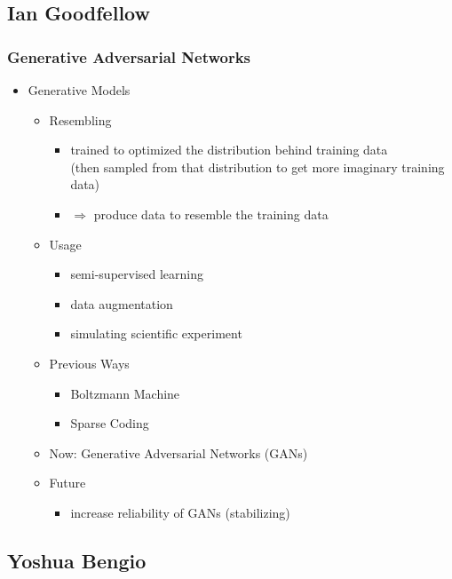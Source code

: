 \subsection{Ian Goodfellow}
\subsubsection{Generative Adversarial Networks}
\begin{itemize}
\item Generative Models
	\begin{itemize}
	\item Resembling
		\begin{itemize}
		\item trained to optimized the distribution behind training data \\ 
		(then sampled from that distribution to get more imaginary training data)
		\item $\Rightarrow$ produce data to resemble the training data
		\end{itemize}
	\item Usage
		\begin{itemize}
		\item semi-supervised learning
		\item data augmentation
		\item simulating scientific experiment
		\end{itemize}
	\item Previous Ways
		\begin{itemize}
		\item Boltzmann Machine
		\item Sparse Coding
		\end{itemize}
	\item Now: Generative Adversarial Networks (GANs)
	\item Future
		\begin{itemize}
		\item increase reliability of GANs (stabilizing)
		\end{itemize}
	\end{itemize}
\end{itemize}

\subsection{Yoshua Bengio}

